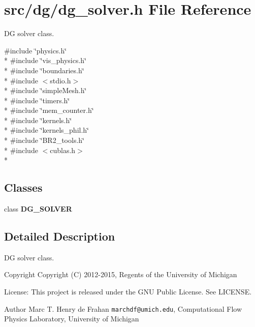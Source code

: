 \section{src/dg/dg\-\_\-solver.h File Reference}
\label{dg__solver_8h}


D\-G solver class.  


{\ttfamily \#include \char`\"{}physics.\-h\char`\"{}}\\*
{\ttfamily \#include \char`\"{}vis\-\_\-physics.\-h\char`\"{}}\\*
{\ttfamily \#include \char`\"{}boundaries.\-h\char`\"{}}\\*
{\ttfamily \#include $<$stdio.\-h$>$}\\*
{\ttfamily \#include \char`\"{}simple\-Mesh.\-h\char`\"{}}\\*
{\ttfamily \#include \char`\"{}timers.\-h\char`\"{}}\\*
{\ttfamily \#include \char`\"{}mem\-\_\-counter.\-h\char`\"{}}\\*
{\ttfamily \#include \char`\"{}kernels.\-h\char`\"{}}\\*
{\ttfamily \#include \char`\"{}kernels\-\_\-phil.\-h\char`\"{}}\\*
{\ttfamily \#include \char`\"{}B\-R2\-\_\-tools.\-h\char`\"{}}\\*
{\ttfamily \#include $<$cublas.\-h$>$}\\*
\subsection*{Classes}
\begin{DoxyCompactItemize}
\item 
class {\bf D\-G\-\_\-\-S\-O\-L\-V\-E\-R}
\end{DoxyCompactItemize}


\subsection{Detailed Description}
D\-G solver class. \begin{DoxyCopyright}{Copyright}
Copyright (C) 2012-\/2015, Regents of the University of Michigan 
\end{DoxyCopyright}
\begin{DoxyParagraph}{License\-:}
This project is released under the G\-N\-U Public License. See L\-I\-C\-E\-N\-S\-E. 
\end{DoxyParagraph}
\begin{DoxyAuthor}{Author}
Marc T. Henry de Frahan {\tt marchdf@umich.\-edu}, Computational Flow Physics Laboratory, University of Michigan 
\end{DoxyAuthor}
